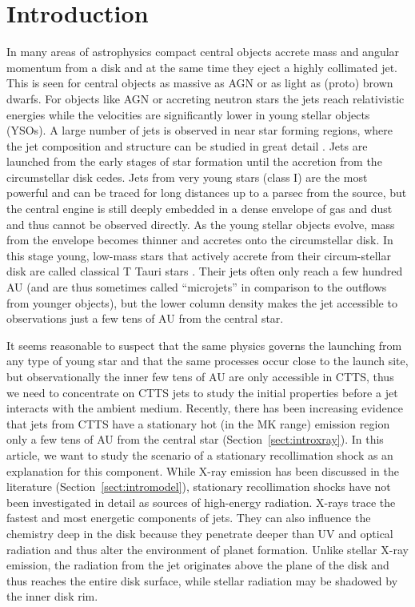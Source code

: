 \section{Introduction} 
In many areas of astrophysics compact central objects accrete mass and angular momentum from a disk and at the same time they eject a highly collimated jet. This is seen for central objects as massive as AGN or as light as (proto) brown dwarfs. For objects like AGN or accreting neutron stars the jets reach relativistic energies while the velocities are significantly lower in young stellar objects (YSOs). 
A large number of jets is observed in near star forming regions, where the jet composition and structure can be studied in great detail \citep[see the review by][]{2014arXiv1402.3553F}.
Jets are launched from the early stages of star formation until the accretion from the circumstellar disk cedes. Jets from very young stars (class I) are the most powerful and can be traced for long distances up to a parsec from the source, but the central engine is still deeply embedded in a dense envelope of gas and dust and thus cannot be observed directly. As the young stellar objects evolve, mass from the envelope becomes thinner and accretes onto the circumstellar disk. In this stage young, low-mass stars that actively accrete from their circum-stellar disk are called classical T Tauri stars \citep[for a review see][]{2013AN....334...67G}. Their jets often only reach a few hundred AU (and are thus sometimes called ``microjets'' in comparison to the outflows from younger objects), but the lower column density makes the jet accessible to observations just a few tens of AU from the central star.

It seems reasonable to suspect that the same physics governs the launching from any type of young star and that the same processes occur close to the launch site, but observationally the inner few tens of AU are only accessible in CTTS, thus we need to concentrate on CTTS jets to study the initial properties before a jet interacts with the ambient medium. Recently, there has been increasing evidence that jets from CTTS have a stationary hot (in the MK range) emission region only a few tens of AU from the central star (Section~\ref{sect:introxray}). In this article, we want to study the scenario of a stationary recollimation shock as an explanation for this component. While X-ray emission has been discussed in the literature (Section~\ref{sect:intromodel}), stationary recollimation shocks have not been investigated in detail as sources of high-energy radiation. X-rays trace the fastest and most energetic components of jets. They can also influence the chemistry deep in the disk \citep[e.g.][]{2010ApJ...714.1511H,2012ApJ...756..157G} because they penetrate deeper than UV and optical radiation and thus alter the environment of planet formation. Unlike stellar X-ray emission, the radiation from the jet originates above the plane of the disk and thus reaches the entire disk surface, while stellar radiation may be shadowed by the inner disk rim.

